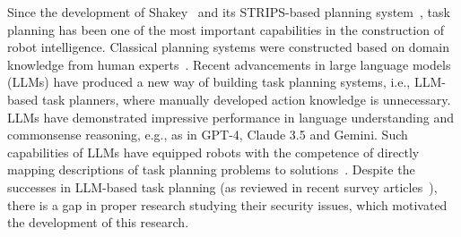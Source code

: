 \documentclass{article}
\begin{document}
Since the development of Shakey~\cite{nilsson1984shakey} and its STRIPS-based planning system~\cite{fikes1971strips}, task planning has been one of the most important capabilities in the construction of robot intelligence. 
Classical planning systems were constructed based on domain knowledge from human experts~\cite{hoffmann2001ff,baier2009heuristic,helmert2006fast,hopcroft2001introduction,pnueli1989synthesis}. 
Recent advancements in large language models (LLMs) have produced a new way of building task planning systems, i.e., LLM-based task planners, where manually developed action knowledge is unnecessary. 
LLMs have demonstrated impressive performance in language understanding and commonsense reasoning, e.g., as in GPT-4, Claude 3.5 and Gemini. 
Such capabilities of LLMs have equipped robots with the competence of directly mapping descriptions of task planning problems to solutions~\cite{ahn2022can, singh2023progprompt, huang2022language, rana2023sayplan, liu2023llm+, ding2023integrating}. 
Despite the successes in LLM-based task planning (as reviewed in recent survey articles~\cite{kawaharazuka2024real,pallagani2024prospects}), there is a gap in proper research studying their security issues, which motivated the development of this research. 
\end{document}
